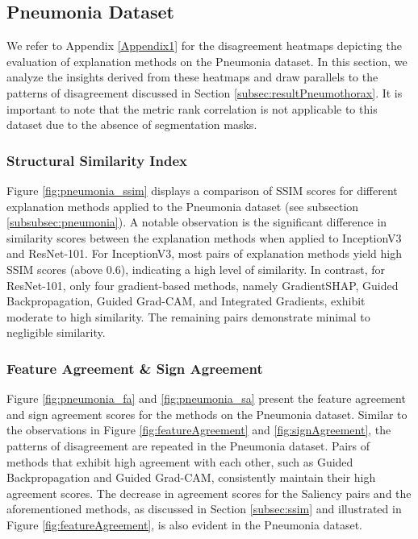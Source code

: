\subsection{Pneumonia Dataset}
We refer to Appendix \ref{Appendix1} for the disagreement heatmaps depicting the evaluation of explanation methods on the Pneumonia dataset. In this section, we analyze the insights derived from these heatmaps and draw parallels to the patterns of disagreement discussed in Section \ref{subsec:resultPneumothorax}. It is important to note that the metric rank correlation is not applicable to this dataset due to the absence of segmentation masks.

\subsubsection{Structural Similarity Index}
Figure \ref{fig:pneumonia_ssim} displays a comparison of SSIM scores for different explanation methods applied to the Pneumonia dataset (see subsection \ref{subsubsec:pneumonia}). A notable observation is the significant difference in similarity scores between the explanation methods when applied to InceptionV3 and ResNet-101. For InceptionV3, most pairs of explanation methods yield high SSIM scores (above 0.6), indicating a high level of similarity. In contrast, for ResNet-101, only four gradient-based methods, namely GradientSHAP, Guided Backpropagation, Guided Grad-CAM, and Integrated Gradients, exhibit moderate to high similarity. The remaining pairs demonstrate minimal to negligible similarity.

\subsubsection{Feature Agreement \& Sign Agreement}
Figure \ref{fig:pneumonia_fa} and \ref{fig:pneumonia_sa} present the feature agreement and sign agreement scores for the methods on the Pneumonia dataset. Similar to the observations in Figure \ref{fig:featureAgreement} and \ref{fig:signAgreement}, the patterns of disagreement are repeated in the Pneumonia dataset. Pairs of methods that exhibit high agreement with each other, such as Guided Backpropagation and Guided Grad-CAM, consistently maintain their high agreement scores. The decrease in agreement scores for the Saliency pairs and the aforementioned methods, as discussed in Section \ref{subsec:ssim} and illustrated in Figure \ref{fig:featureAgreement}, is also evident in the Pneumonia dataset.